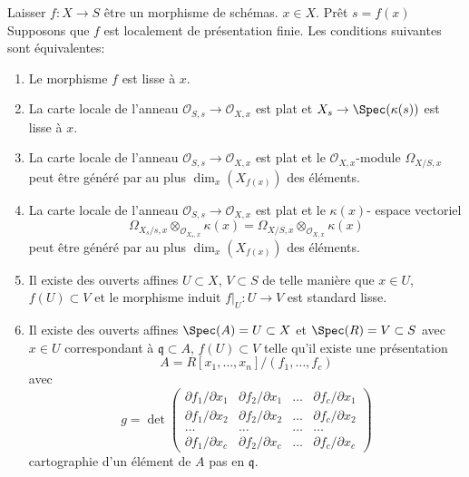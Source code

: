 \begin{lemma}

\label{lemma-smooth-at-point}

Laisser $f : X \to S$ être un morphisme de schémas. $x \in X$. Prêt $s = f(x)$Supposons que $f$ est localement de présentation finie. Les conditions suivantes sont équivalentes:

\begin{enumerate}

\item Le morphisme $f$ est lisse à $x$.
\item La carte locale de l'anneau $\mathcal{O}_{S, s} \to \mathcal{O}_{X, x}$
est plat et $X_s \to \Spec(\kappa(s))$ est lisse à $x$.
\item La carte locale de l'anneau $\mathcal{O}_{S, s} \to \mathcal{O}_{X, x}$
est plat et le $\mathcal{O}_{X, x}$-module $\Omega_{X/S, x}$
peut être généré par au plus $\dim_x(X_{f(x)})$ des éléments.
\item La carte locale de l'anneau $\mathcal{O}_{S, s} \to \mathcal{O}_{X, x}$
est plat et le $\kappa(x)$- espace vectoriel
$$
\Omega_{X_s/s, x} \otimes_{\mathcal{O}_{X_s, x}} \kappa(x) =
\Omega_{X/S, x} \otimes_{\mathcal{O}_{X, x}} \kappa(x)
$$
peut être généré par au plus $\dim_x(X_{f(x)})$ des éléments.
\item Il existe des ouverts affines $U \subset X$, $V \subset S$ de telle manière que $x \in U$, $f(U) \subset V$ et le morphisme induit $f|_U : U \to V$ est standard lisse.
\item Il existe des ouverts affines $\Spec(A) = U \subset X$
et $\Spec(R) = V \subset S$ avec $x \in U$ correspondant à $\mathfrak q \subset A$, $f(U) \subset V$
telle qu'il existe une présentation
$$
A = R[x_1, \ldots, x_n]/(f_1, \ldots, f_c)
$$
avec
$$
g =
\det
\left(
\begin{matrix}
\partial f_1/\partial x_1 &
\partial f_2/\partial x_1 &
\ldots &
\partial f_c/\partial x_1 \\
\partial f_1/\partial x_2 &
\partial f_2/\partial x_2 &
\ldots &
\partial f_c/\partial x_2 \\
\ldots & \ldots & \ldots & \ldots \\
\partial f_1/\partial x_c &
\partial f_2/\partial x_c &
\ldots &
\partial f_c/\partial x_c
\end{matrix}
\right)
$$
cartographie d'un élément de $A$ pas en $\mathfrak q$.

\end{enumerate}

\end{lemma}

